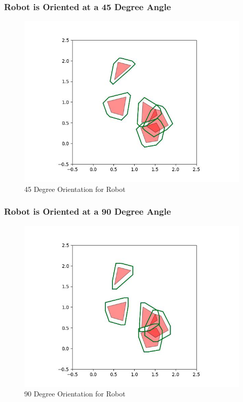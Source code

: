 \documentclass{article}
\begin{document}
\newpage
\subsubsection{Robot is Oriented at a 45 Degree Angle}
\begin{figure}[h!]
	\includegraphics[width= 0.9 \linewidth]{Problem3_minkowski3_45.jpg}
	\centering
	\caption{45 Degree Orientation for Robot}
	\label{Problem3_minkowski3_45.jpg}
\end{figure}

\newpage
\subsubsection{Robot is Oriented at a 90 Degree Angle}
\begin{figure}[h!]
	\includegraphics[width= 0.9 \linewidth]{Problem3_minkowski3_90.jpg}
	\centering
	\caption{90 Degree Orientation for Robot}
	\label{Problem3_minkowski3_90.jpg}
\end{figure}
\end{document}
